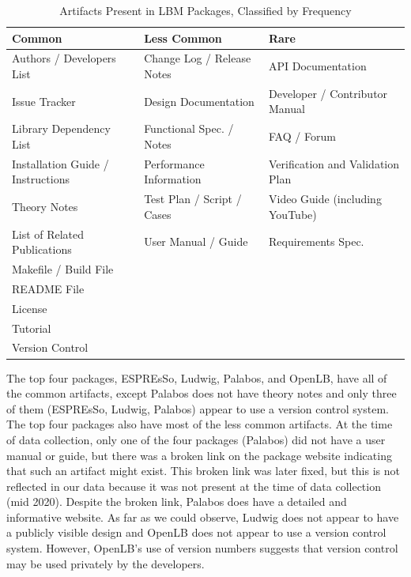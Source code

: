 \documentclass[final, 3p, times, authoryear]{elsarticle}
\begin{document}
\begin{table}
\begin{center}
\begin{tabular}{ p{5.3 cm} p{4.9 cm} p{5 cm}}
\toprule
\textbf{Common} & \textbf{Less Common} & \textbf{Rare} \\
\midrule
Authors / Developers List & Change Log / Release Notes & API Documentation\\
Issue Tracker & Design Documentation & Developer / Contributor Manual\\
Library Dependency List & Functional Spec. / Notes & FAQ / Forum\\
Installation Guide / Instructions & Performance Information & Verification and
Validation Plan\\
Theory Notes & Test Plan / Script / Cases & Video Guide
(including YouTube)\\
List of Related Publications & User Manual / Guide & Requirements Spec.\\
Makefile / Build File &  & \\
README File & & \\
License & & \\
Tutorial & & \\
Version Control & & \\
\bottomrule
\end{tabular}
\caption{Artifacts Present in LBM Packages, Classified by Frequency}
\label{artifactspresent}
\end{center}
\end{table}

The top four packages, ESPREsSo, Ludwig, Palabos, and OpenLB, have all of the
common artifacts, except Palabos does not have theory notes and only three of
them (ESPREsSo, Ludwig, Palabos) appear to use a version control system.  The
top four packages also have most of the less common artifacts. At the time of
data collection, only one of the four packages (Palabos) did not have a user
manual or guide, but there was a broken link on the package website indicating
that such an artifact might exist. This broken link was later fixed, but this is
not reflected in our data because it was not present at the time of data
collection (mid 2020). Despite the broken link, Palabos does have a detailed and
informative website. As far as we could observe, Ludwig does not appear to have
a publicly visible design and OpenLB does not appear to use a version control
system. However, OpenLB's use of version numbers suggests that version control
may be used privately by the developers.
\end{document}
